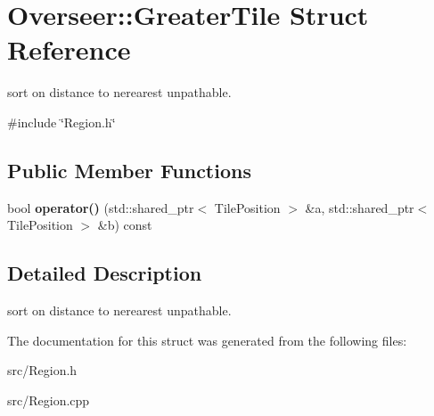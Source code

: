 \hypertarget{structOverseer_1_1GreaterTile}{}\section{Overseer\+:\+:Greater\+Tile Struct Reference}
\label{structOverseer_1_1GreaterTile}


sort on distance to nerearest unpathable.  




{\ttfamily \#include \char`\"{}Region.\+h\char`\"{}}

\subsection*{Public Member Functions}
\begin{DoxyCompactItemize}
\item 
\mbox{\label{structOverseer_1_1GreaterTile_a08458d9588ae2352caf223ef79510d1d}} 
bool {\bfseries operator()} (std\+::shared\+\_\+ptr$<$ Tile\+Position $>$ \&a, std\+::shared\+\_\+ptr$<$ Tile\+Position $>$ \&b) const
\end{DoxyCompactItemize}


\subsection{Detailed Description}
sort on distance to nerearest unpathable. 

The documentation for this struct was generated from the following files\+:\begin{DoxyCompactItemize}
\item 
src/Region.\+h\item 
src/Region.\+cpp\end{DoxyCompactItemize}
